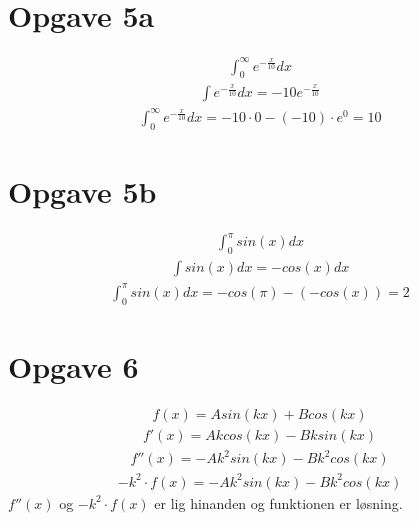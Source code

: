 \documentclass{article}
\newcommand{\eq}[1]{\begin{align*}#1\end{align*}}
\begin{document}
\section*{Opgave 5a}
\eq{\int_{0}^{\infty} e^{-\frac{x}{10}} dx}
\eq{\int e^{-\frac{x}{10}} dx=-10 e^{-\frac{x}{10}}}
\eq{\int_{0}^{\infty} e^{-\frac{x}{10}} dx=-10 \cdot 0 - (-10)\cdot e^0=10}
\section*{Opgave 5b}
\eq{\int_{0}^{\pi} sin(x) dx}
\eq{\int sin(x) dx = -cos(x) dx}
\eq{\int_{0}^{\pi} sin(x) dx = -cos(\pi)-(-cos(x))=2}
\section*{Opgave 6}
\eq{f(x)=Asin(kx)+Bcos(kx)}
\eq{f'(x)=Akcos(kx)-Bksin(kx)}
\eq{f''(x)=-Ak^2sin(kx)-Bk^2cos(kx)}
\eq{-k^2\cdot f(x)=-Ak^2sin(kx)-Bk^2cos(kx)}
$ f''(x)$ og $ -k^2 \cdot f(x)$ er lig hinanden og funktionen er løsning.
\end{document}
